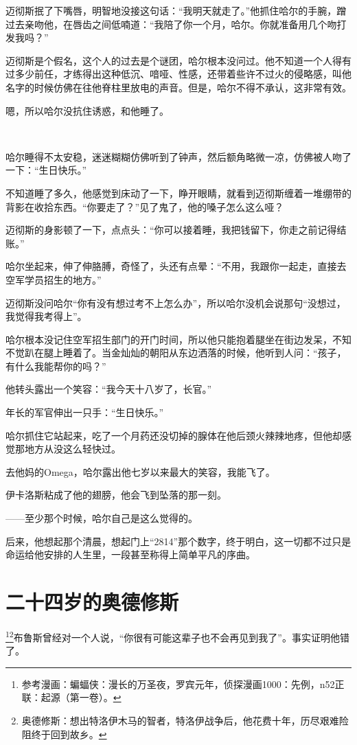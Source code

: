 \documentclass[../main]{subfiles}
\begin{document}
迈彻斯抿了下嘴唇，明智地没接这句话：“我明天就走了。”他抓住哈尔的手腕，蹭过去亲吻他，在唇齿之间低喃道：“我陪了你一个月，哈尔。你就准备用几个吻打发我吗？”

迈彻斯是个假名，这个人的过去是个谜团，哈尔根本没问过。他不知道一个人得有过多少前任，才练得出这种低沉、喑哑、性感，还带着些许不过火的侵略感，叫他名字的时候仿佛在往他脊柱里放电的声音。但是，哈尔不得不承认，这非常有效。

嗯，所以哈尔没抗住诱惑，和他睡了。

~\

哈尔睡得不太安稳，迷迷糊糊仿佛听到了钟声，然后额角略微一凉，仿佛被人吻了一下：“生日快乐。”

不知道睡了多久，他感觉到床动了一下，睁开眼睛，就看到迈彻斯缠着一堆绷带的背影在收拾东西。“你要走了？”见了鬼了，他的嗓子怎么这么哑？

迈彻斯的身影顿了一下，点点头：“你可以接着睡，我把钱留下，你走之前记得结账。”

哈尔坐起来，伸了伸胳膊，奇怪了，头还有点晕：“不用，我跟你一起走，直接去空军学员招生的地方。”

迈彻斯没问哈尔“你有没有想过考不上怎么办”，所以哈尔没机会说那句“没想过，我觉得我考得上”。

哈尔根本没记住空军招生部门的开门时间，所以他只能抱着腿坐在街边发呆，不知不觉趴在腿上睡着了。当金灿灿的朝阳从东边洒落的时候，他听到人问：“孩子，有什么我能帮你的吗？”

他转头露出一个笑容：“我今天十八岁了，长官。”

年长的军官伸出一只手：“生日快乐。”

哈尔抓住它站起来，吃了一个月药还没切掉的腺体在他后颈火辣辣地疼，但他却感觉那地方从没这么轻快过。

去他妈的Omega，哈尔露出他七岁以来最大的笑容，我能飞了。

伊卡洛斯粘成了他的翅膀，他会飞到坠落的那一刻。

——至少那个时候，哈尔自己是这么觉得的。

后来，他想起那个清晨，想起门上“2814”那个数字，终于明白，这一切都不过只是命运给他安排的人生里，一段甚至称得上简单平凡的序曲。


\section{二十四岁的奥德修斯}

\footnote[1]{参考漫画：蝙蝠侠：漫长的万圣夜，罗宾元年，侦探漫画1000：先例，n52正联：起源（第一卷）。}\footnote[2]{奥德修斯：想出特洛伊木马的智者，特洛伊战争后，他花费十年，历尽艰难险阻终于回到故乡。}布鲁斯曾经对一个人说，“你很有可能这辈子也不会再见到我了”。事实证明他错了。
\end{document}
